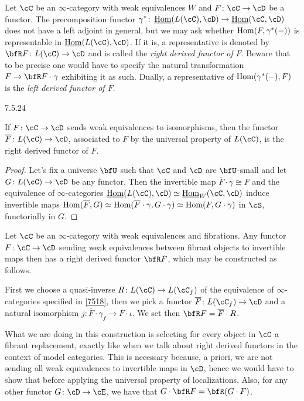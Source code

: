 \documentclass[a4paper,fontsize=12pt]{scrartcl}
\begin{document}
\begin{rmk}
  Let $\cC$ be an $\infty$-category with weak equivalences $W$ and
  $F\colon\cC\rightarrow\cD$ be a functor. The precomposition functor
  $\gamma^*\colon\Home(L(\cC),\cD)\rightarrow\Home(\cC,\cD)$ does not have a
  left adjoint in general, but we may ask whether $\operatorname{Hom}(F,\gamma^*(-))$ is
  representable in $\Home(L(\cC),\cD)$. If it is, a representative is denoted by
  $\bfR F\colon L(\cC)\rightarrow\cD$ and is called the \emph{right derived
  functor of $F$}. Beware that to be precise one would have to specify the
  natural transformation $F\rightarrow\bfR F\cdot\gamma$ exhibiting it as such.
  Dually, a representative of $\operatorname{Hom}(\gamma^*(-),F)$ is the \emph{left derived
  functor of $F$}.
\end{rmk}

\begin{prop}\label{7524}
  7.5.24

  If $F\colon\cC\rightarrow\cD$ sends weak equivalences to isomorphisms, then
  the functor $\overline{F}\colon L(\cC)\rightarrow\cD$, associated to $F$ by
  the universal property of $L(\cC)$, is the right derived functor of $F$.
\end{prop}
\begin{proof}
  Let's fix a universe $\bfU$ such that $\cC$ and $\cD$ are $\bfU$-small and let
  $G\colon L(\cC)\rightarrow\cD$ be any functor. Then the invertible map
  $\overline{F}\cdot\gamma\cong F$ and the equivalence of $\infty$-categories
  $\Home(L(\cC),\cD)\simeq\Home_W(\cC,\cD)$ induce invertible maps
  $\operatorname{Hom}(\overline{F},G)\simeq\operatorname{Hom}(\overline{F}\cdot\gamma,G\cdot\gamma)\simeq\operatorname{Hom}(F,G\cdot\gamma)$
  in $\cS$, functorially in $G$.
\end{proof}

\begin{construction}\label{7525}

  Let $\cC$ be an $\infty$-category with weak equivalences and fibrations. Any
  functor $F\colon\cC\rightarrow\cD$ sending weak equivalences between fibrant
  objects to invertible maps then has a right derived functor $\bfR F$, which
  may be constructed as follows.

  First we choose a quasi-inverse $R\colon L(\cC)\rightarrow L(\cC_f)$ of the
  equivalence of $\infty$-categories specified in \ref{7518}, then we pick a
  functor $\overline{F}\colon L(\cC_f)\rightarrow\cD$ and a natural isomorphism
  $j\colon\overline{F}\cdot\gamma_f\rightarrow F\cdot\iota$. We set then $\bfR
  F=\overline{F}\cdot R$.

  What we are doing in this construction is selecting
  for every object in $\cC$ a fibrant replacement, exactly like when we talk
  about right derived functors in the context of model categories. This is
  necessary because, a priori, we are not sending all weak equivalences to
  invertible maps in $\cD$, hence we would have to show that before applying the
  universal property of localizations. Also, for any
  other functor $G\colon\cD\rightarrow\cE$, we have that $G\cdot\bfR
  F=\bfR(G\cdot F)$.
\end{construction}
\end{document}
